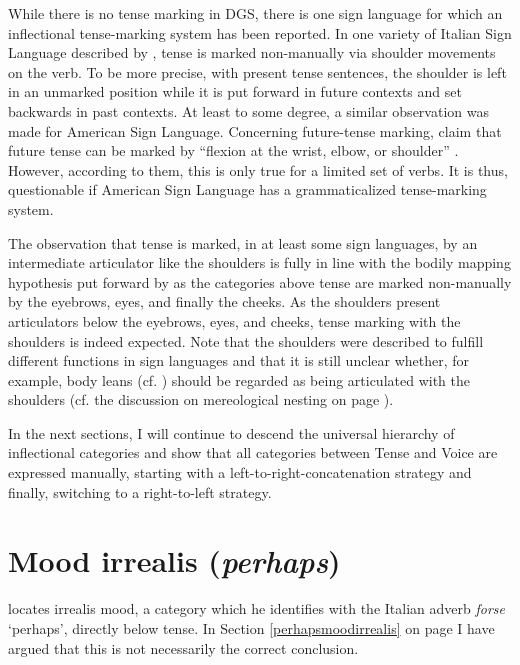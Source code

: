 \noindent While there is no tense marking in DGS, there is one sign language for which an inflectional tense-marking system has been reported. In one variety of Italian Sign Language described by \citet{zucchi2009along}, tense is marked non-manually via shoulder movements on the verb. To be more precise, with present tense sentences, the shoulder is left in an unmarked position while it is put forward in future contexts and set backwards in past contexts. At least to some degree, a similar observation was made for American Sign Language. Concerning future-tense marking, \citet{jacobowitz1988signs} claim that future tense can be marked by ``flexion at the wrist, elbow, or shoulder'' \citep[337]{jacobowitz1988signs}. However, according to them, this is only true for a limited set of verbs. It is thus, questionable if American Sign Language has a grammaticalized tense-marking system.

The observation that tense is marked, in at least some sign languages, by an intermediate articulator like the shoulders is fully in line with the bodily mapping hypothesis put forward by  \citet{bross2017scope} as the categories above tense are marked non-manually by the eyebrows, eyes, and finally the cheeks. As the shoulders present articulators below the eyebrows, eyes, and cheeks, tense marking with the shoulders is indeed expected. Note that the shoulders were described to fulfill different functions in sign languages and that it is still unclear whether, for example, body leans (cf. \citealt{wilbur1998body}) should be regarded as being articulated with the shoulders (cf. the discussion on mereological nesting on page \pageref{nesting}).

In the next sections, I will continue to descend the universal hierarchy of inflectional categories and show that all categories between Tense and Voice are expressed manually, starting with a left-to-right-concatenation strategy and finally, switching to a right-to-left strategy.


\section{Mood irrealis (\textit{perhaps})}
\citet{cinque1999adverbs} locates irrealis mood, a category which he identifies with the Italian adverb \textit{forse} `perhaps', directly below tense. In Section \ref{perhapsmoodirrealis} on page \pageref{perhapsmoodirrealis} I have argued that this is not necessarily the correct conclusion.


